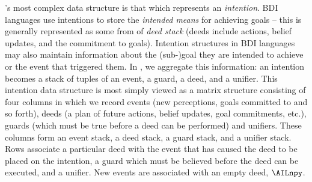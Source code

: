 \ail's most complex data structure is that which represents an
\emph{intention}.  BDI languages use intentions to
store the \emph{intended means} for achieving goals -- this is
generally represented as some from of {\em deed stack} (deeds include
actions, belief updates, and the commitment to
goals).  Intention structures in BDI languages may
also maintain information about the (sub-)goal they are intended to
achieve or the event that triggered them. In \ail, we aggregate
this information: an intention becomes a stack of tuples of an
event, a guard, a deed, and a
unifier.  This \ail{} intention data structure is most
simply viewed as a matrix structure consisting of four columns in
which we record events (new perceptions, goals committed to and so
forth), deeds (a plan of future actions, belief updates, goal
commitments, etc.), guards (which must be true before a deed can be
performed) and unifiers. These columns form an event
stack, a deed 
stack, a guard stack, and a unifier stack.  Rows associate a
particular deed with the event that has caused the deed to be placed
on the intention, a guard which must be believed before the deed can
be executed, and a unifier. New events are associated with an empty
deed, $\AILnpy$\index{$\AILnpy$}.

